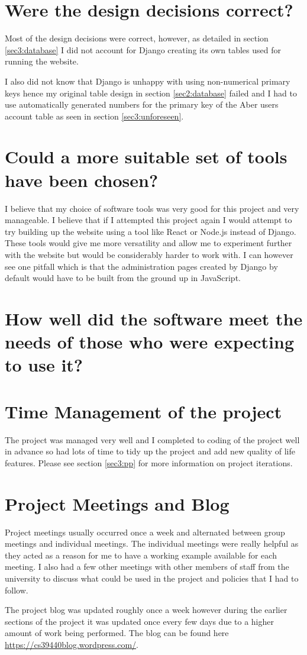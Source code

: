\section{Were the design decisions correct?}
Most of the design decisions were correct, however, as detailed in section \ref{sec3:database} I did not account for Django creating its own tables used for running the website. 

I also did not know that Django is unhappy with using non-numerical primary keys hence my original table design in section \ref{sec2:database} failed and I had to use automatically generated numbers for the primary key of the Aber users account table as seen in section \ref{sec3:unforeseen}.

\section{Could a more suitable set of tools have been chosen?}
I believe that my choice of software tools was very good for this project and very manageable. I believe that if I attempted this project again I would attempt to try building up the website using a tool like React or Node.js instead of Django. These tools would give me more versatility and allow me to experiment further with the website but would be considerably harder to work with. I can however see one pitfall which is that the administration pages created by Django by default would have to be built from the ground up in JavaScript.

\section{How well did the software meet the needs of those who were expecting to use it?}

\section{Time Management of the project}
The project was managed very well and I completed to coding of the project well in advance so had lots of time to tidy up the project and add new quality of life features. Please see section \ref{sec3:pp} for more information on project iterations.

\section{Project Meetings and Blog}
Project meetings usually occurred once a week and alternated between group meetings and individual meetings. The individual meetings were really helpful as they acted as a reason for me to have a working example available for each meeting. I also had a few other meetings with other members of staff from the university to discuss what could be used in the project and policies that I had to follow. 

The project blog was updated roughly once a week however during the earlier sections of the project it was updated once every few days due to a higher amount of work being performed. The blog can be found here \href{https://cs39440blog.wordpress.com/}{https://cs39440blog.wordpress.com/}.
